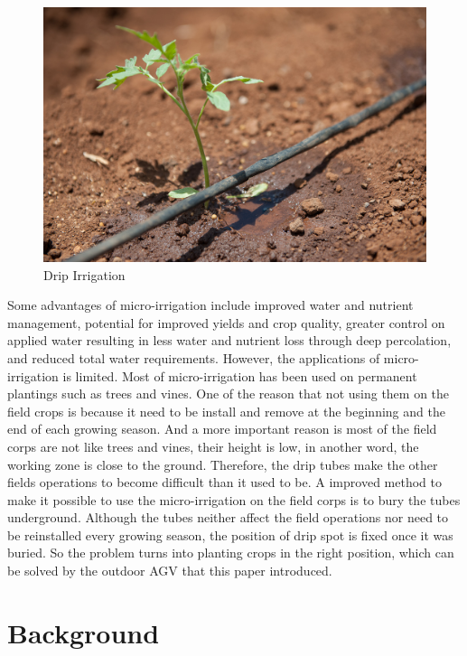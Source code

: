 \documentclass[12pt]{article}
\begin{document}
\begin{flushleft}
\begin{figure}[ht!]
	\begin{center}
		\includegraphics[scale = 0.25]{drip.jpg}
		\caption{Drip Irrigation}
	\end{center}
\end{figure}
Some advantages of micro-irrigation include improved water and nutrient management, potential for improved yields and crop quality, greater control on applied water resulting in less water and nutrient loss through deep percolation, and reduced total water requirements. \cite{phene1986advantages} However, the applications of micro-irrigation is limited. Most of micro-irrigation has been used on permanent plantings such as trees and vines. One of the reason that not using them on the field crops is because it need to be install and remove at the beginning and the end of each growing season. And a more important reason is most of the field corps are not like trees and vines, their height is low, in another word, the working zone is close to the ground. Therefore, the drip tubes make the other fields operations to become difficult than it used to be. A improved method to make it possible to use the micro-irrigation on the field corps is to bury the tubes underground. \cite{camp1998subsurface} Although the tubes neither affect the field operations nor need to be reinstalled every growing season, the position of drip spot is fixed once it was buried. So the problem turns into planting crops in the right position, which can be solved by the outdoor AGV that this paper introduced. 


\section{Background}


\end{flushleft}
\end{document}
